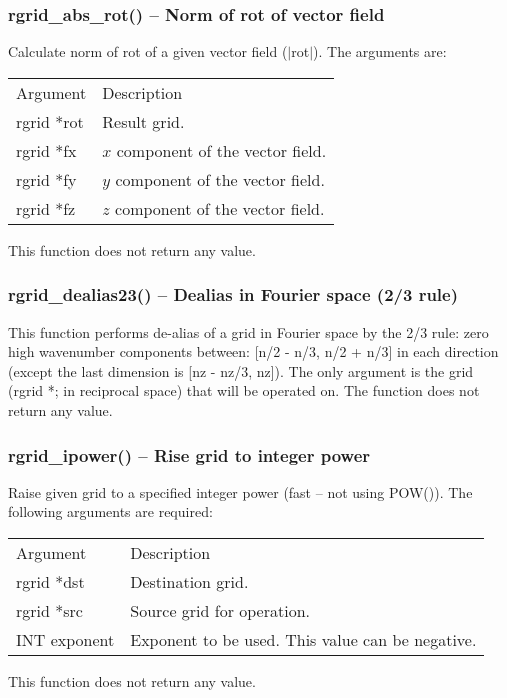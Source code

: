 \documentclass[12pt,letterpaper]{article}
\begin{document}
\subsubsection{rgrid\_abs\_rot() -- Norm of rot of vector field}

Calculate norm of rot of a given vector field ($|$rot$|$). The arguments are:
\begin{longtable}{p{} p{}}
Argument & Description\\
\cline{1-2}
rgrid *rot & Result grid.\\
rgrid *fx  & $x$ component of the vector field.\\
rgrid *fy  & $y$ component of the vector field.\\
rgrid *fz  & $z$ component of the vector field.\\
\end{longtable}
\noindent
This function does not return any value. 

\subsubsection{rgrid\_dealias23() -- Dealias in Fourier space (2/3 rule)}

This function performs de-alias of a grid in Fourier space by the 2/3 rule: zero high wavenumber components between: [n/2 - n/3, n/2 + n/3] in each direction (except the last dimension is [nz - nz/3, nz]). The only argument is the grid (rgrid *; in reciprocal space) that will be operated on. The function does not return any value.

\subsubsection{rgrid\_ipower() -- Rise grid to integer power}

Raise given grid to a specified integer power (fast -- not using POW()). The following arguments are required:
\begin{longtable}{p{} p{}}
Argument & Description\\
\cline{1-2}
rgrid *dst & Destination grid.\\
rgrid *src & Source grid for operation.\\
INT exponent & Exponent to be used. This value can be negative.\\
\end{longtable}
\noindent
This function does not return any value. 
\end{document}
